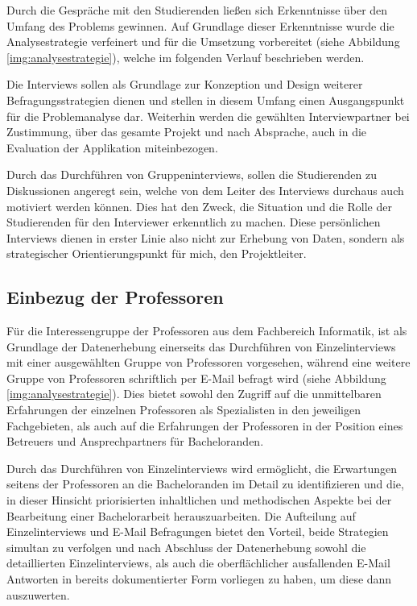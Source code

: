 \documentclass{scrreprt}
\begin{document}
\par Durch die Gespräche mit den Studierenden ließen sich Erkenntnisse über den Umfang des Problems gewinnen. Auf Grundlage dieser Erkenntnisse wurde die Analysestrategie verfeinert und für die Umsetzung vorbereitet (siehe Abbildung \ref{img:analysestrategie}), welche im folgenden Verlauf beschrieben werden.
\par Die Interviews sollen als Grundlage zur Konzeption und Design weiterer Befragungsstrategien dienen und stellen in diesem Umfang einen Ausgangspunkt für die Problemanalyse dar. Weiterhin werden die gewählten Interviewpartner bei Zustimmung, über das gesamte Projekt und nach Absprache, auch in die Evaluation der Applikation miteinbezogen.
\par\medskip Durch das Durchführen von Gruppeninterviews, sollen die Studierenden zu Diskussionen angeregt sein, welche von dem Leiter des Interviews durchaus auch motiviert werden können. Dies hat den Zweck, die Situation und die Rolle der Studierenden für den Interviewer erkenntlich zu machen.  Diese persönlichen Interviews dienen in erster Linie also nicht zur Erhebung von Daten, sondern als strategischer Orientierungspunkt für mich, den Projektleiter.\\

\subsection{Einbezug der Professoren}
\par Für die Interessengruppe der Professoren aus dem Fachbereich Informatik, ist als Grundlage der Datenerhebung einerseits das Durchführen von Einzelinterviews mit einer ausgewählten Gruppe von Professoren vorgesehen, während eine weitere Gruppe von Professoren schriftlich per E-Mail befragt wird (siehe Abbildung \ref{img:analysestrategie}). Dies bietet sowohl den Zugriff auf die unmittelbaren Erfahrungen der einzelnen Professoren als Spezialisten in den jeweiligen Fachgebieten, als auch auf die Erfahrungen der Professoren in der Position eines Betreuers und Ansprechpartners für Bacheloranden. 
\par Durch das Durchführen von Einzelinterviews wird ermöglicht, die Erwartungen seitens der Professoren an die Bacheloranden im Detail zu identifizieren und die, in dieser Hinsicht priorisierten inhaltlichen und methodischen Aspekte bei der Bearbeitung einer Bachelorarbeit herauszuarbeiten. Die Aufteilung auf Einzelinterviews und E-Mail Befragungen bietet den Vorteil, beide Strategien simultan zu verfolgen und nach Abschluss der Datenerhebung sowohl die detaillierten Einzelinterviews, als auch die oberflächlicher ausfallenden E-Mail Antworten in bereits dokumentierter Form vorliegen zu haben, um diese dann auszuwerten.\\
\end{document}
